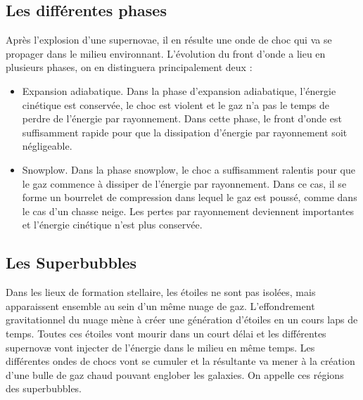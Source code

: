 



\subsection{Les différentes phases}
Après l'explosion d'une supernovae, il en résulte une onde de choc qui va se propager dans le milieu environnant.
L'évolution du front d'onde a lieu en plusieurs phases, on en distinguera principalement deux : 

\begin{itemize}
\item Expansion adiabatique.
Dans la phase d'expansion adiabatique, l'énergie cinétique est conservée, le choc est violent et le gaz n'a pas le temps de perdre de l'énergie par rayonnement.
Dans cette phase, le front d'onde est suffisamment rapide pour que la dissipation d'énergie par rayonnement soit négligeable.

\item Snowplow.
Dans la phase snowplow, le choc a suffisamment ralentis pour que le gaz commence à dissiper de l'énergie par rayonnement.
Dans ce cas, il se forme un bourrelet de compression dans lequel le gaz est poussé, comme dans le cas d'un chasse neige. 
Les pertes par rayonnement deviennent importantes et l'énergie cinétique n'est plus conservée.
\end{itemize}

\subsection{Les Superbubbles}

Dans les lieux de formation stellaire, les étoiles ne sont pas isolées, mais apparaissent ensemble au sein d'un même nuage de gaz.
L'effondrement gravitationnel du nuage mène à créer une génération d’étoiles en un cours laps de temps.
Toutes ces étoiles vont mourir dans un court délai et les différentes supernovæ vont injecter de l’énergie dans le milieu en même temps.
Les différentes ondes de chocs vont se cumuler et la résultante va mener à la création d'une bulle de gaz chaud pouvant englober les galaxies.
On appelle ces régions des superbubbles.

